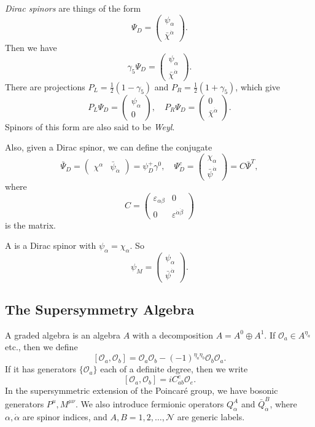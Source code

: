 \documentclass[a4paper]{article}
\begin{document}
\emph{Dirac spinors} are things of the form
\[
  \Psi_D = \begin{pmatrix}\psi_\alpha\\\bar{\chi}^{\dot{\alpha}}\end{pmatrix}.
\]
Then we have
\[
  \gamma_5 \Psi_D = \begin{pmatrix}\psi_\alpha\\\bar{\chi}^{\dot{\alpha}}\end{pmatrix}.
\]
There are projections $P_L = \frac{1}{2} (1 - \gamma_5)$ and $P_R = \frac{1}{2}(1 + \gamma_5)$, which give
\[
  P_L \Psi_D = \begin{pmatrix}\psi_\alpha\\ 0\end{pmatrix},\quad
  P_R \Psi_D = \begin{pmatrix}0\\\bar{\chi}^{\dot{\alpha}}\end{pmatrix}.
\]
Spinors of this form are also said to be \emph{Weyl}.

Also, given a Dirac spinor, we can define the conjugate
\[
  \bar{\Psi}_D =
  \begin{pmatrix}
    \chi^\alpha & \bar{\psi}_{\dot{\alpha}}
  \end{pmatrix} = \psi_D^+ \gamma^0,\quad \Psi_D^c =
  \begin{pmatrix}
    \chi_\alpha \\ \bar{\psi}^{\dot{\alpha}}
  \end{pmatrix} = C \bar{\Psi}^T,
\]
where
\[
  C =
  \begin{pmatrix}
    \varepsilon_{\alpha\beta} & 0\\
    0 & \varepsilon^{\dot{\alpha} \dot{\beta}}
  \end{pmatrix}
\]
is the  matrix.

A  is a Dirac spinor with $\psi_\alpha = \chi_\alpha$. So
\[
  \psi_M =
  \begin{pmatrix}
    \psi_\alpha\\ \bar{\psi}^{\dot{\alpha}}
  \end{pmatrix}.
\]
\subsection{The Supersymmetry Algebra}
A graded algebra is an algebra $A$ with a decomposition $A = A^0 \oplus A^1$. If $\mathcal{O}_a \in A^{\eta_a}$ etc., then we define %
\[
  [\mathcal{O}_a, \mathcal{O}_b] = \mathcal{O}_a \mathcal{O}_b - (-1)^{\eta_a \eta_b} \mathcal{O}_b \mathcal{O}_a. %
\]
If it has generators $\{\mathcal{O}_a\}$ each of a definite degree, then we write
\[
  [\mathcal{O}_a, \mathcal{O}_b] = i C^e_{ab} \mathcal{O}_e.
\]
In the supersymmetric extension of the Poincar\'e group, we have bosonic generators $P^\mu, M^{\mu\nu}$. We also introduce fermionic operators $Q_\alpha^A$ and $\bar{Q}_{\dot{\alpha}}^B$, where $\alpha, \dot{\alpha}$ are spinor indices, and $A, B = 1, 2, \ldots, \mathcal{N}$ are generic labels.
\end{document}
